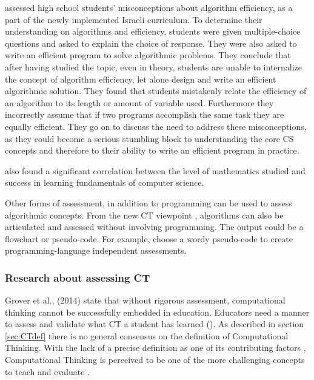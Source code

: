  assessed high school students' misconceptions about algorithm efficiency, as a part of the newly implemented Israeli curriculum. To determine their understanding on algorithms and efficiency, students were given multiple-choice questions and asked to explain the choice of response. They were also asked to write an efficient program to solve algorithmic problems. They conclude that after having studied the topic, even in theory, students are unable to internalize the concept of algorithm efficiency, let alone design and write an efficient algorithmic solution. They found that students mistakenly relate the efficiency of an algorithm to its length or amount of variable used. Furthermore they incorrectly assume that if two programs accomplish the same task they are equally efficient. They go on to discuss the need to address these misconceptions, as they could become a serious stumbling block to understanding the core CS concepts and therefore to their ability to write an efficient program in practice.

\cite{gal2002efficiency} also found a significant correlation between the level of mathematics studied and success in learning fundamentals of computer science.


Other forms of assessment, in addition to programming can be used to assess algorithmic concepts. From the new CT viewpoint \cite{denning2017remaining}, algorithms can also be articulated and assessed without involving programming. The output could be a flowchart \cite{Smetsers2017} or pseudo-code. For example,  choose a wordy pseudo-code to create programming-language independent assessments.


\subsubsection{Research about assessing CT}

Grover et al., (2014) state that without rigorous assessment, computational thinking cannot be successfully embedded in education. Educators need a manner to assess and validate what CT a student has learned (\cite{GroverPea2013}). As described in section \ref{sec:CTdef} there is no general consensus on the definition of Computational Thinking. With the lack of a precise definition as one of its contributing factors \cite{crick2017}, Computational Thinking is perceived to be one of the more challenging concepts to teach and evaluate \cite{BrennanResnick2012}.

